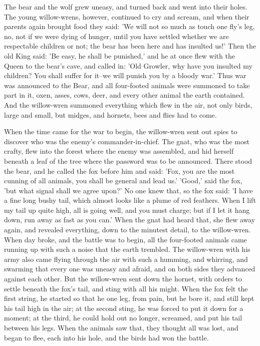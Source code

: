 \documentclass[12pt]{book}
\begin{document}
The bear and the wolf grew uneasy, and turned back and went into their
holes. The young willow-wrens, however, continued to cry and scream,
and when their parents again brought food they said: 'We will not so
much as touch one fly's leg, no, not if we were dying of hunger, until
you have settled whether we are respectable children or not; the bear
has been here and has insulted us!' Then the old King said: 'Be easy,
he shall be punished,' and he at once flew with the Queen to the
bear's cave, and called in: 'Old Growler, why have you insulted my
children? You shall suffer for it--we will punish you by a bloody
war.' Thus war was announced to the Bear, and all four-footed animals
were summoned to take part in it, oxen, asses, cows, deer, and every
other animal the earth contained. And the willow-wren summoned
everything which flew in the air, not only birds, large and small, but
midges, and hornets, bees and flies had to come.

When the time came for the war to begin, the willow-wren sent out
spies to discover who was the enemy's commander-in-chief. The gnat,
who was the most crafty, flew into the forest where the enemy was
assembled, and hid herself beneath a leaf of the tree where the
password was to be announced. There stood the bear, and he called the
fox before him and said: 'Fox, you are the most cunning of all
animals, you shall be general and lead us.' 'Good,' said the fox, 'but
what signal shall we agree upon?' No one knew that, so the fox said:
'I have a fine long bushy tail, which almost looks like a plume of red
feathers. When I lift my tail up quite high, all is going well, and
you must charge; but if I let it hang down, run away as fast as you
can.' When the gnat had heard that, she flew away again, and revealed
everything, down to the minutest detail, to the willow-wren. When day
broke, and the battle was to begin, all the four-footed animals came
running up with such a noise that the earth trembled. The willow-wren
with his army also came flying through the air with such a humming,
and whirring, and swarming that every one was uneasy and afraid, and
on both sides they advanced against each other. But the willow-wren
sent down the hornet, with orders to settle beneath the fox's tail,
and sting with all his might. When the fox felt the first string, he
started so that he one leg, from pain, but he bore it, and
still kept his tail high in the air; at the second sting, he was
forced to put it down for a moment; at the third, he could hold out no
longer, screamed, and put his tail between his legs. When the animals
saw that, they thought all was lost, and began to flee, each into his
hole, and the birds had won the battle.
\end{document}
